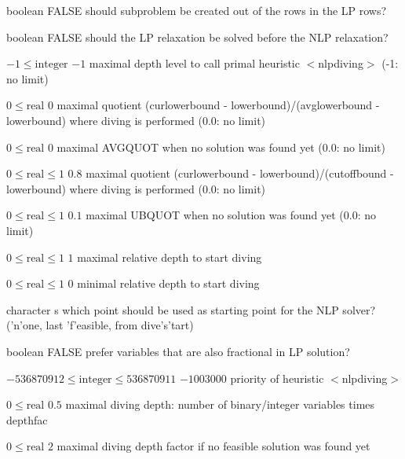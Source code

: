 %
{boolean}%
{FALSE}%
{should subproblem be created out of the rows in the LP rows?}%
{}

%
{boolean}%
{FALSE}%
{should the LP relaxation be solved before the NLP relaxation?}%
{}

%
{$-1\leq\textrm{integer}$}%
{$-1$}%
{maximal depth level to call primal heuristic $<$nlpdiving$>$ (-1: no limit)}%
{}

%
{$0\leq\textrm{real}$}%
{$0$}%
{maximal quotient (curlowerbound - lowerbound)/(avglowerbound - lowerbound) where diving is performed (0.0: no limit)}%
{}

%
{$0\leq\textrm{real}$}%
{$0$}%
{maximal AVGQUOT when no solution was found yet (0.0: no limit)}%
{}

%
{$0\leq\textrm{real}\leq1$}%
{$0.8$}%
{maximal quotient (curlowerbound - lowerbound)/(cutoffbound - lowerbound) where diving is performed (0.0: no limit)}%
{}

%
{$0\leq\textrm{real}\leq1$}%
{$0.1$}%
{maximal UBQUOT when no solution was found yet (0.0: no limit)}%
{}

%
{$0\leq\textrm{real}\leq1$}%
{$1$}%
{maximal relative depth to start diving}%
{}

%
{$0\leq\textrm{real}\leq1$}%
{$0$}%
{minimal relative depth to start diving}%
{}

%
{character}%
{s}%
{which point should be used as starting point for the NLP solver? ('n'one, last 'f'easible, from dive's'tart)}%
{}

%
{boolean}%
{FALSE}%
{prefer variables that are also fractional in LP solution?}%
{}

%
{$-536870912\leq\textrm{integer}\leq536870911$}%
{$-1003000$}%
{priority of heuristic $<$nlpdiving$>$}%
{}

%
{$0\leq\textrm{real}$}%
{$0.5$}%
{maximal diving depth: number of binary/integer variables times depthfac}%
{}

%
{$0\leq\textrm{real}$}%
{$2$}%
{maximal diving depth factor if no feasible solution was found yet}%
{}

